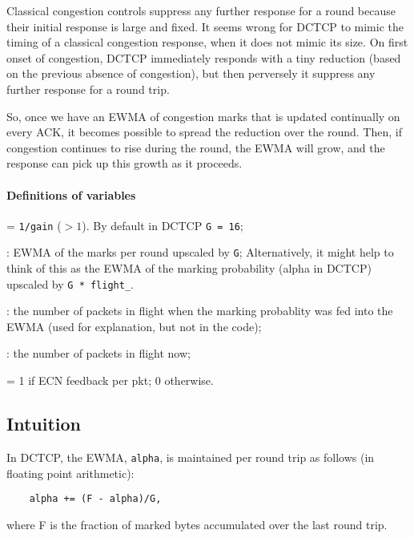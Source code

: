 Classical congestion controls suppress any further response for a round because
their initial response is large and fixed. It seems wrong for DCTCP to mimic the
timing of a classical congestion response, when it does not mimic its size. On
first onset of congestion, DCTCP immediately responds with a tiny reduction
(based on the previous absence of congestion), but then perversely it suppress
any further response for a round trip.

So, once we have an EWMA of congestion marks that is updated continually on
every ACK, it becomes possible to spread the reduction over the round. Then,  if
congestion continues to rise during the round, the EWMA will grow, and the
response can pick up this growth as it proceeds.

\paragraph{Definitions of variables}
\begin{description}[nosep]
	\item [\texttt{G}] = \texttt{1/gain} (\(>1\)). By default in DCTCP \texttt{G = 16};
	\item [\texttt{av\_up}]: EWMA of the marks per round upscaled by \texttt{G};
	Alternatively, it might help to think of this as the EWMA of the marking
	probability (alpha in DCTCP) upscaled by \texttt{G * flight\_}. 
	\item [\texttt{flight\_}]: the number of packets in flight when the marking
	probablity was fed into the EWMA (used for explanation, but not in the code);
	\item [\texttt{flight}]: the number of packets in flight now;
	\item [\texttt{ce\_fb}] = 1 if ECN feedback per pkt; 0 otherwise.
\end{description}

\subsection{Intuition}\label{prresp_intuition}

In DCTCP, the EWMA, \texttt{alpha}, is maintained per round trip as follows (in
floating point arithmetic):
\begin{verbatim}
    alpha += (F - alpha)/G,
\end{verbatim}
where F is the fraction of marked bytes accumulated over the last round trip.

